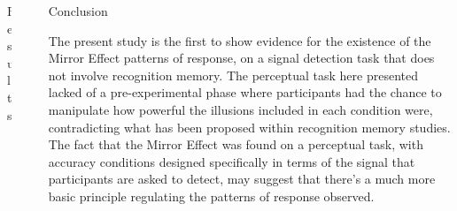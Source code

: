 \documentclass[final]{beamer}
\newlength{\sepwid}
\newlength{\onecolwid}
\newlength{\twocolwid}
\begin{document}
\begin{frame}[t]
\begin{columns}[t]
\begin{column}{\twocolwid}
\begin{columns}[t,totalwidth=\twocolwid]
\begin{column}{\onecolwid}
\begin{block}{Results}
\end{block}


\end{column} %

\end{columns} %

\end{column} %

\begin{column}{\sepwid}\end{column} %

\begin{column}{\onecolwid} %


\begin{block}{Conclusion}

The present study is the first to show evidence for the existence of the Mirror Effect patterns of response, on a signal detection task that does not involve recognition memory. The perceptual task here presented lacked of a pre-experimental phase where participants had the chance to manipulate how powerful the illusions included in each condition were, contradicting what has been proposed within recognition memory studies. The fact that the Mirror Effect was found on a perceptual task, with accuracy conditions designed specifically in terms of the signal that participants are asked to detect, may suggest that there’s a much more basic principle regulating the patterns of response observed.


\end{block}



\end{column}
\end{columns}
\end{frame}
\end{document}
